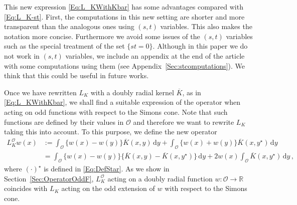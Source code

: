 \documentclass[12pt,reqno]{amsart}
\theoremstyle{definition}
\theoremstyle{remark}
\newcommand{\con}[1]{\mathbb{#1}}
\newcommand{\R}{\con{R}} %
\newcommand{\ocal}{\mathcal{O}}
\renewcommand{\d}{\,\mathrm{d}} %
\numberwithin{equation}{section}
\begin{document}
This new expression \eqref{Eq:L_KWithKbar} has some advantages compared with \eqref{Eq:L_K-st}. First, the computations in this new setting are shorter and more transparent than the analogous ones using $(s,t)$ variables. This also makes the notation more concise. Furthermore we avoid some issues of the $(s,t)$ variables such as the special treatment of the set $\{st=0\}$. Although in this paper we do not work in $(s,t)$ variables, we include an appendix at the end of the article with some computations using them (see Appendix~\ref{Sec:stcomputations}). We think that this could be useful in future works.  


Once we have rewritten $L_K$ with a doubly radial kernel $\overline{K}$, as in \eqref{Eq:L_KWithKbar}, we shall find a suitable expression of the operator when acting on odd functions with respect to the Simons cone. Note that such functions are defined by their values in $\ocal$ and therefore we want to rewrite $L_K$ taking this into account. To this purpose, we define the new operator
\begin{equation}
\label{Eq:OperatorOddF}
\begin{split}
L_K^\ocal w (x)  &:= \int_{\ocal} \{w(x) - w(y) \} \overline{K}(x, y) \d y +  \int_{\ocal} \{w(x) + w(y) \} \overline{K}(x, y^\star) \d y \\
&= \int_{\ocal} \{w(x) - w(y) \} \{\overline{K}(x, y) - \overline{K}(x, y^\star)  \} \d y +  2 w(x) \int_{\ocal} \overline{K}(x, y^\star) \d y \,,
\end{split}
\end{equation}
where $(\cdot)^\star$ is defined in \eqref{Eq:DefStar}. As we show in Section~\ref{Sec:OperatorOddF}, $L_K^\ocal$ acting on a doubly radial function $w:\ocal \to \R$ coincides with $L_K$ acting on the odd extension of $w$ with respect to the Simons cone.
\end{document}

